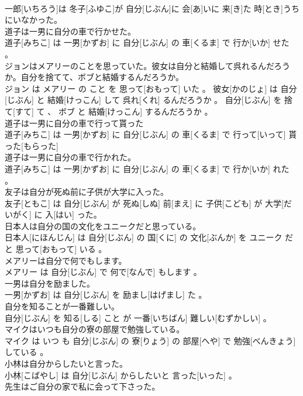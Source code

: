 \documentclass[8pt]{extreport}
\begin{document}
\begin{CJK}{UTF8}{min}
\\	一郎[いちろう]は 冬子[ふゆこ]が 自分[じぶん]に 会[あ]いに 来[き]た 時[とき]うちにいなかった。
\\	道子は一男に自分の車で行かせた。	
\\	道子[みちこ] は 一男[かずお] に 自分[じぶん] の 車[くるま] で 行か[いか] せた 。
\\	ジョンはメアリーのことを思っていた。彼女は自分と結婚して呉れるんだろうか。自分を捨てて、ボブと結婚するんだろうか。	
\\	ジョン は メアリー の こと を 思って[おもって] いた 。 彼女[かのじょ] は 自分[じぶん] と 結婚[けっこん] して 呉れ[くれ] るんだろうか 。 自分[じぶん] を 捨て[すて] て 、 ボブ と 結婚[けっこん] するんだろうか 。
\\	道子は一男に自分の車で行って貰った	
\\	道子[みちこ] は 一男[かずお] に 自分[じぶん] の 車[くるま] で 行って[いって] 貰った[もらった]
\\	道子は一男に自分の車で行かれた。	
\\	道子[みちこ] は 一男[かずお] に 自分[じぶん] の 車[くるま] で 行か[いか] れた 。
\\	友子は自分が死ぬ前に子供が大学に入った。	
\\	友子[ともこ] は 自分[じぶん] が 死ぬ[しぬ] 前[まえ] に 子供[こども] が 大学[だいがく] に 入[はい] った。
\\	日本人は自分の国の文化をユニークだと思っている。	
\\	日本人[にほんじん] は 自分[じぶん] の 国[くに] の 文化[ぶんか] を ユニーク だと 思って[おもって] いる 。
\\	メアリーは自分で何でもします。	
\\	メアリー は 自分[じぶん] で 何で[なんで] もします 。
\\	一男は自分を励ました。	
\\	一男[かずお] は 自分[じぶん] を 励まし[はげまし] た 。
\\	自分を知ることが一番難しい。	
\\	自分[じぶん] を 知る[しる] こと が 一番[いちばん] 難しい[むずかしい] 。
\\	マイクはいつも自分の寮の部屋で勉強している。	
\\	マイク は いつ も 自分[じぶん] の 寮[りょう] の 部屋[へや] で 勉強[べんきょう] している 。
\\	小林は自分からしたいと言った。	
\\	小林[こばやし] は 自分[じぶん] からしたいと 言った[いった] 。
\\	先生はご自分の家で私に会って下さった。	

\end{CJK}
\end{document}
